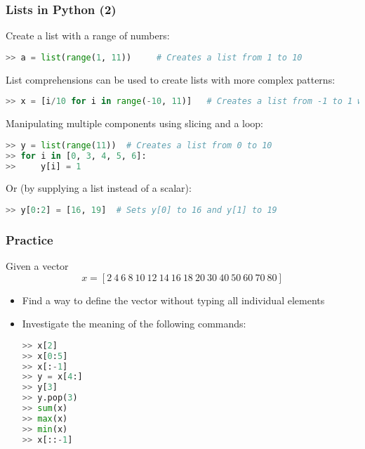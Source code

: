  \begin{frame}[fragile]
   \frametitle{Lists in Python (2)}
   Create a list with a range of numbers:
   \begin{lstlisting}[language=Python]
>> a = list(range(1, 11))     # Creates a list from 1 to 10
   \end{lstlisting}\pause
   List comprehensions can be used to create lists with more complex patterns:
   \begin{lstlisting}[language=Python]
>> x = [i/10 for i in range(-10, 11)]   # Creates a list from -1 to 1 with a step of 0.1
   \end{lstlisting}\pause
   Manipulating multiple components using slicing and a loop:
   \begin{lstlisting}[language=Python]
>> y = list(range(11))  # Creates a list from 0 to 10
>> for i in [0, 3, 4, 5, 6]: 
>>     y[i] = 1
   \end{lstlisting}\pause
   Or (by supplying a list instead of a scalar):
   \begin{lstlisting}[language=Python]
>> y[0:2] = [16, 19]  # Sets y[0] to 16 and y[1] to 19
   \end{lstlisting}
 \end{frame}
 

\begin{frame}[fragile]
 \frametitle{Practice}
 Given a vector 
 \[ 
    x = \left[2 \ 4 \ 6 \ 8 \ 10 \ 12 \ 14 \ 16 \ 18 \ 20 \ 30 \ 40 \ 50 \ 60 \ 70 \ 80 \right]
 \]
 \begin{itemize}
  \item Find a way to define the vector without typing all individual elements\pause
  \item Investigate the meaning of the following commands:
  \begin{lstlisting}[language=Python]
>> x[2]            
>> x[0:5]          
>> x[:-1]          
>> y = x[4:]       
>> y[3]            
>> y.pop(3)      
>> sum(x)    
>> max(x)       
>> min(x) 
>> x[::-1]       
    \end{lstlisting}    
 \end{itemize}
\end{frame}

